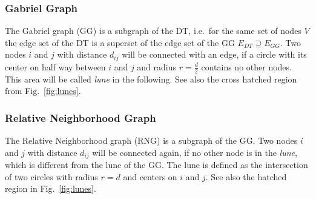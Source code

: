     \subsubsection{Gabriel Graph}
        The Gabriel graph (GG) \cite{Gabriel1969}
        is a subgraph of the DT, i.e.\ for the same set of nodes
        \(V\) the edge set of the DT is a superset of the edge set of the
        GG \(E_{DT} \supseteq E_{GG}\). Two nodes \(i\) and \(j\) with distance
        \(d_{ij}\) will be connected with an edge, if a circle with its
        center on half way between \(i\) and \(j\) and radius
        \(r = \frac d 2\) contains no other nodes. This area will be
        called \emph{lune} in the following. See also the cross hatched region
        from Fig.\ \ref{fig:lunes}.

    \subsubsection{Relative Neighborhood Graph}
        The Relative Neighborhood
        graph (RNG) \cite{Toussaint1980} is a subgraph of the GG. Two nodes \(i\) and \(j\) with
        distance \(d_{ij}\) will be connected again, if no other node is in the
        \emph{lune}, which is different from the lune of the GG. The lune
        is defined as the intersection of two
        circles with radius \(r = d\) and centers on \(i\) and \(j\).
        See also the hatched region in Fig.\ \ref{fig:lunes}.

